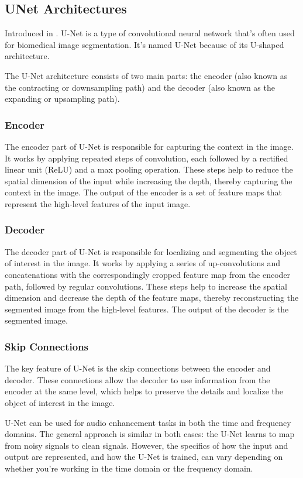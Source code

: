 \subsection{UNet Architectures}

Introduced in \cite{ronneberger2015u-net}. U-Net is a type of convolutional neural network that's often used for biomedical image segmentation. It's named U-Net because of its U-shaped architecture.

The U-Net architecture consists of two main parts: the encoder (also known as the contracting or downsampling path) and the decoder (also known as the expanding or upsampling path).

\subsubsection{Encoder}
The encoder part of U-Net is responsible for capturing the context in the image. It works by applying repeated steps of convolution, each followed by a rectified linear unit (ReLU) and a max pooling operation. These steps help to reduce the spatial dimension of the input while increasing the depth, thereby capturing the context in the image. The output of the encoder is a set of feature maps that represent the high-level features of the input image.

\subsubsection{Decoder}
The decoder part of U-Net is responsible for localizing and segmenting the object of interest in the image. It works by applying a series of up-convolutions and concatenations with the correspondingly cropped feature map from the encoder path, followed by regular convolutions. These steps help to increase the spatial dimension and decrease the depth of the feature maps, thereby reconstructing the segmented image from the high-level features. The output of the decoder is the segmented image.

\subsubsection{Skip Connections}
The key feature of U-Net is the skip connections between the encoder and decoder. These connections allow the decoder to use information from the encoder at the same level, which helps to preserve the details and localize the object of interest in the image.

U-Net can be used for audio enhancement tasks in both the time and frequency domains. The general approach is similar in both cases: the U-Net learns to map from noisy signals to clean signals. However, the specifics of how the input and output are represented, and how the U-Net is trained, can vary depending on whether you're working in the time domain or the frequency domain.

